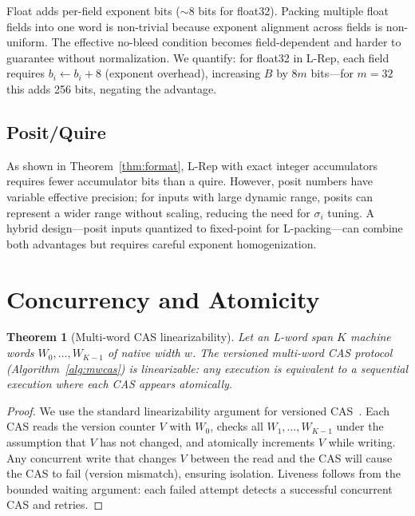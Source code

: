 \documentclass[11pt,a4paper]{article}
\theoremstyle{definition}
\theoremstyle{plain}
\newtheorem{theorem}{Theorem}[section]
\theoremstyle{remark}
\begin{document}
Float adds per-field exponent bits ($\sim$8 bits for float32).  Packing multiple float fields into one word is non-trivial because exponent alignment across fields is non-uniform.  The effective no-bleed condition becomes field-dependent and harder to guarantee without normalization.  We quantify: for float32 in L-Rep, each field requires $b_i \gets b_i + 8$ (exponent overhead), increasing $B$ by $8m$ bits---for $m=32$ this adds 256 bits, negating the advantage.

\subsection{Posit/Quire}

As shown in Theorem~\ref{thm:format}, L-Rep with exact integer accumulators requires fewer accumulator bits than a quire.  However, posit numbers have variable effective precision; for inputs with large dynamic range, posits can represent a wider range without scaling, reducing the need for $\sigma_i$ tuning.  A hybrid design---posit inputs quantized to fixed-point for L-packing---can combine both advantages but requires careful exponent homogenization.

\section{Concurrency and Atomicity}
\label{sec:concurrency}

\begin{theorem}[Multi-word CAS linearizability]
\label{thm:cas}
Let an L-word span $K$ machine words $W_0,\ldots,W_{K-1}$ of native width $w$.  The versioned multi-word CAS protocol (Algorithm~\ref{alg:mwcas}) is linearizable: any execution is equivalent to a sequential execution where each CAS appears atomically.
\end{theorem}

\begin{proof}
We use the standard linearizability argument for versioned CAS~\cite{harris2002}.  Each CAS reads the version counter $V$ with $W_0$, checks all $W_1,\ldots,W_{K-1}$ under the assumption that $V$ has not changed, and atomically increments $V$ while writing.  Any concurrent write that changes $V$ between the read and the CAS will cause the CAS to fail (version mismatch), ensuring isolation.  Liveness follows from the bounded waiting argument: each failed attempt detects a successful concurrent CAS and retries.
\end{proof}
\end{document}
